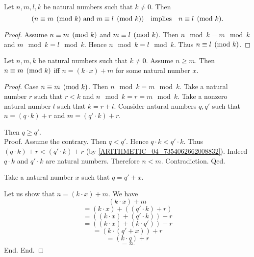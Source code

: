 \documentclass[../arithmetic.tex]{subfiles}
\begin{document}
  \begin{forthel}
    \begin{proposition}
      Let $n, m, l, k$ be natural numbers such that $k \neq 0$.
      Then \[ (\text{$n\equiv m\pmod{k}$ and $m\equiv l\pmod{k}$}) \quad \text{implies} \quad
      n\equiv l\pmod{k}. \]
    \end{proposition}
    \begin{proof}
      Assume $n\equiv m\pmod{k}$ and $m\equiv l\pmod{k}$.
      Then $n \mod k = m \mod k$ and $m \mod k = l \mod k$.
      Hence $n \mod k = l \mod k$.
      Thus $n\equiv l\pmod{k}$.
    \end{proof}
  \end{forthel}

  \begin{forthel}
    \begin{proposition}
      Let $n, m, k$ be natural numbers such that $k \neq 0$.
      Assume $n \geq m$.
      Then $n\equiv m\pmod{k}$ iff $n = (k \cdot x) \plus m$ for some natural
      number $x$.
    \end{proposition}
    \begin{proof}
      Case $n\equiv m\pmod{k}$.
        Then $n \mod k = m \mod k$.
        Take a natural number $r$ such that $r \less k$ and
        $n \mod k = r = m \mod k$.
        Take a nonzero natural number $l$ such that $k = r \plus l$.
        Consider natural numbers $q,q'$ such that $n = (q \cdot k) \plus r$ and
        $m = (q' \cdot k) \plus r$.

        Then $q \geq q'$. \\
        Proof.
          Assume the contrary.
          Then $q \less q'$.
          Hence $q \cdot k \less q' \cdot k$.
          Thus $(q \cdot k) \plus r \less (q' \cdot k) \plus r$
          (by \cref{ARITHMETIC_04_7354062662008832}).
          Indeed $q \cdot k$ and $q' \cdot k$ are natural numbers.
          Therefore $n \less m$.
          Contradiction.
        Qed.

        Take a natural number $x$ such that $q = q' \plus x$.

        Let us show that $n = (k \cdot x) \plus m$.
          We have
          \[  (k \cdot x) \plus m                       \]
          \[    = (k \cdot x) \plus ((q' \cdot k) \plus r)  \]
          \[    = ((k \cdot x) \plus (q' \cdot k)) \plus r  \]
          \[    = ((k \cdot x) \plus (k \cdot q')) \plus r  \]
          \[    = (k \cdot (q' \plus x)) \plus r            \]
          \[    = (k \cdot q) \plus r                   \]
          \[    = n.                                \]
        End.
      End.


\end{proof}
\end{forthel}
\end{document}
